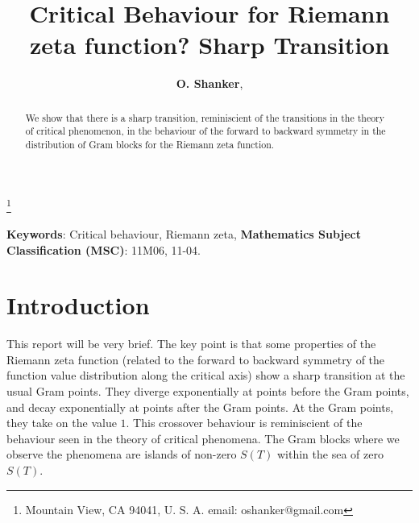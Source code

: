 \documentclass[twoside]{article}
\begin{document}


\newtheorem{theorem}{Theorem}[section]
\newtheorem{lemma}[theorem]{Lemma}

\theoremstyle{definition}
\newtheorem{definition}[theorem]{Definition}
\newtheorem{example}[theorem]{Example}
\newtheorem{xca}[theorem]{Exercise}

\theoremstyle{remark}
\newtheorem{remark}[theorem]{Remark}



\date{}
\lhead[]{}
\rhead[]{}

\title{\bf{Critical Behaviour for Riemann zeta function? Sharp Transition}}

\maketitle


\author{{\textbf{O. Shanker}},}
\thanks{ Mountain View, CA 94041, U. S. A. email: oshanker@gmail.com}

\thispagestyle{fancy}

\begin{abstract}
We show that there is a sharp transition, reminiscient of the transitions in the theory of
critical phenomenon, in the behaviour of the forward to backward symmetry in the distribution
of Gram blocks for the Riemann zeta function.

\end{abstract}
{\textbf {Keywords}:} Critical behaviour, Riemann zeta,  
{\textbf {Mathematics Subject Classification (MSC)}:} 11M06, 11-04.




\section{Introduction}

This report will be very brief. The key point is that some properties of the Riemann zeta function (related to the forward to backward symmetry of the function value distribution along the critical axis) show a sharp transition at the usual Gram points. They diverge exponentially at points before the Gram points, and decay exponentially at points after the Gram points. At the Gram points, they take on the value $1$. This crossover behaviour is reminiscient of the behaviour seen in the theory of critical phenomena.  The Gram blocks where we observe the phenomena are islands of non-zero $S(T)$ within the sea of zero $S(T)$.
\end{document}
